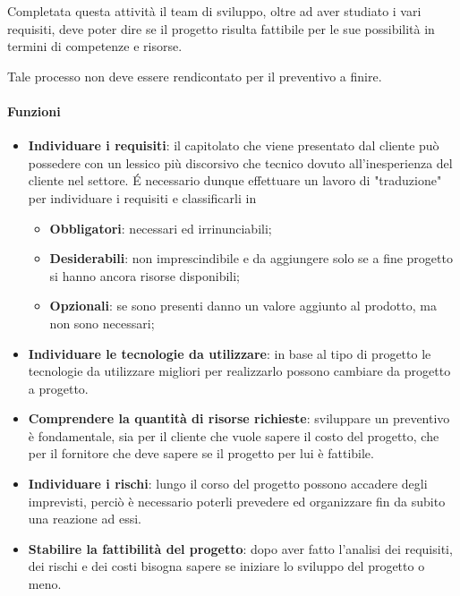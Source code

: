 	Completata questa attività il team di sviluppo, oltre ad aver studiato i vari requisiti, deve poter dire se il progetto risulta fattibile per le sue possibilità in termini di competenze e risorse.
	
	Tale processo non deve essere rendicontato per il preventivo a finire.
	
		\paragraph*{Funzioni}
		
		\begin{itemize}
			\item \textbf{Individuare i requisiti}: il capitolato che viene presentato dal cliente può possedere con un lessico più discorsivo che tecnico dovuto all'inesperienza del cliente nel settore. \'E necessario dunque effettuare un lavoro di "traduzione" per individuare i requisiti e classificarli in
			\begin{itemize}
				\item \textbf{Obbligatori}: necessari ed irrinunciabili;
				\item \textbf{Desiderabili}: non imprescindibile e da aggiungere solo se a fine progetto si hanno ancora risorse disponibili;  
				\item \textbf{Opzionali}: se sono presenti danno un valore aggiunto al prodotto, ma non sono necessari;
			\end{itemize}
			\item \textbf{Individuare le tecnologie da utilizzare}: in base al tipo di progetto le tecnologie da utilizzare migliori per realizzarlo possono cambiare da progetto a progetto.
			\item \textbf{Comprendere la quantità di risorse richieste}: sviluppare un preventivo è fondamentale, sia per il cliente che vuole sapere il costo del progetto, che per il fornitore che deve sapere se il progetto per lui è fattibile.
			\item \textbf{Individuare i rischi}: lungo il corso del progetto possono accadere degli imprevisti, perciò è necessario poterli prevedere ed organizzare fin da subito una reazione ad essi.
			\item \textbf{Stabilire la fattibilità del progetto}: dopo aver fatto l'analisi dei requisiti, dei rischi e dei costi bisogna sapere se iniziare lo sviluppo del progetto o meno.
		\end{itemize}
		

